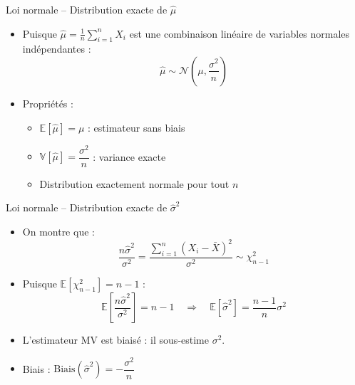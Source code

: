 \documentclass[11pt,aspectratio=169]{beamer}
\begin{document}
\begin{frame}{Loi normale -- Distribution exacte de $\hat{\mu}$}

\begin{itemize}

\item Puisque $\hat{\mu} = \frac{1}{n}\sum_{i=1}^n X_i$ est une combinaison linéaire de variables normales indépendantes :
  \[
  \hat{\mu} \sim \mathcal{N}\left(\mu, \frac{\sigma^2}{n}\right)
  \]

\item Propriétés :
  \begin{itemize}
    \item $\mathbb{E}[\hat{\mu}] = \mu$ : estimateur sans biais\newline
    \item $\mathbb{V}[\hat{\mu}] = \dfrac{\sigma^2}{n}$ : variance exacte\newline
    \item Distribution exactement normale pour tout $n$
  \end{itemize}

\end{itemize}

\end{frame}

\begin{frame}{Loi normale -- Distribution exacte de $\hat{\sigma}^2$}

\begin{itemize}

\item On montre que :
  \[
  \frac{n\hat{\sigma}^2}{\sigma^2} = \frac{\sum_{i=1}^n (X_i - \bar{X})^2}{\sigma^2} \sim \chi^2_{n-1}
  \]

\item Puisque $\mathbb{E}[\chi^2_{n-1}] = n-1$ :
  \[
  \mathbb{E}\left[\frac{n\hat{\sigma}^2}{\sigma^2}\right] = n-1 \quad \Rightarrow \quad \mathbb{E}[\hat{\sigma}^2] = \frac{n-1}{n}\sigma^2
  \]

\item L'estimateur MV est biaisé : il sous-estime $\sigma^2$.\newline

\item Biais : $\text{Biais}(\hat{\sigma}^2) = -\dfrac{\sigma^2}{n}$

\end{itemize}

\end{frame}
\end{document}

